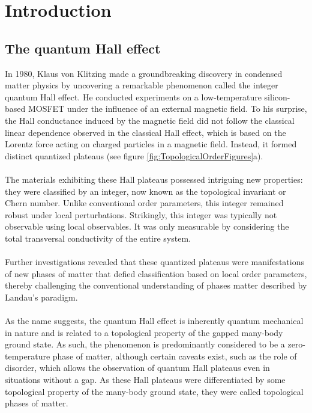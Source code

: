 \chapter{Introduction}\label{ch:introduction}
\section{The quantum Hall effect}
In 1980, Klaus von Klitzing made a groundbreaking discovery in condensed matter physics by uncovering a remarkable phenomenon called the integer quantum Hall effect. He conducted experiments on a low-temperature silicon-based MOSFET under the influence of an external magnetic field. To his surprise, the Hall conductance induced by the magnetic field did not follow the classical linear dependence observed in the classical Hall effect, which is based on the Lorentz force acting on charged particles in a magnetic field. Instead, it formed distinct quantized plateaus (see figure \ref{fig:TopologicalOrderFigures}a).
\\\\
The materials exhibiting these Hall plateaus possessed intriguing new properties: they were classified by an integer, now known as the topological invariant or Chern number. Unlike conventional order parameters, this integer remained robust under local perturbations. Strikingly, this integer was typically not observable using local observables. It was only measurable by considering the total transversal conductivity of the entire system.
\\\\
Further investigations revealed that these quantized plateaus were manifestations of new phases of matter that defied classification based on local order parameters, thereby challenging the conventional understanding of phases matter described by Landau's paradigm.
\\\\
As the name suggests, the quantum Hall effect is inherently quantum mechanical in nature and is related to a topological property of the gapped many-body ground state. As such, the phenomenon is predominantly considered to be a zero-temperature phase of matter, although certain caveats exist, such as the role of disorder, which allows the observation of quantum Hall plateaus even in situations without a gap. As these Hall plateaus were differentiated by some topological property of the many-body ground state, they were called topological phases of matter.
\\\\
